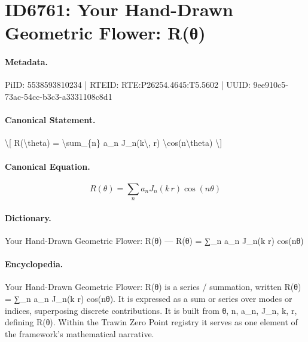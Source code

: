 \section*{ID6761: Your Hand-Drawn Geometric Flower: R(θ)}
\paragraph{Metadata.}
PiID: 5538593810234 | RTEID: RTE:P26254.4645:T5.5602 | UUID: 9ee910c5-73ac-54cc-b3c3-a3331108c8d1

\paragraph{Canonical Statement.}
\textbackslash{}[ R(\textbackslash{}theta) = \textbackslash{}sum\_\{n\} a\_n J\_n(k\textbackslash{}, r) \textbackslash{}cos(n\textbackslash{}theta) \textbackslash{}]

\paragraph{Canonical Equation.}
\[
R(\theta) = \sum_{n} a_n J_n(k\, r) \cos(n\theta)
\]

\paragraph{Dictionary.}
Your Hand-Drawn Geometric Flower: R(θ) — R(θ) = ∑\_n a\_n J\_n(k r) cos(nθ)

\paragraph{Encyclopedia.}
Your Hand-Drawn Geometric Flower: R(θ) is a series / summation, written R(θ) = ∑\_n a\_n J\_n(k r) cos(nθ). It is expressed as a sum or series over modes or indices, superposing discrete contributions. It is built from θ, n, a\_n, J\_n, k, r, defining R(θ). Within the Trawin Zero Point registry it serves as one element of the framework's mathematical narrative.
